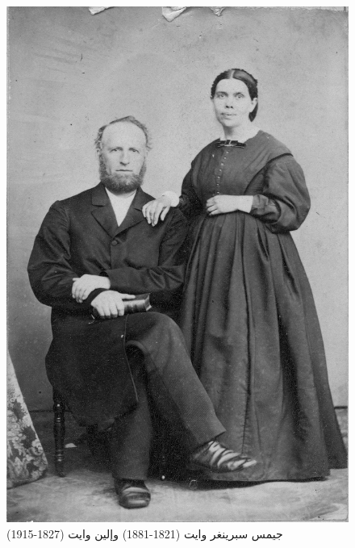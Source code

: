 \begin{figure}[hp]
    \centering
    \includegraphics[width=1\linewidth]{images/james-and-ellen-white.jpg}
    \caption*{جيمس سبرينغر وايت (1821-1881) وإلين وايت (1827-1915)}
    \label{fig:james-and-ellen-white}
\end{figure}


